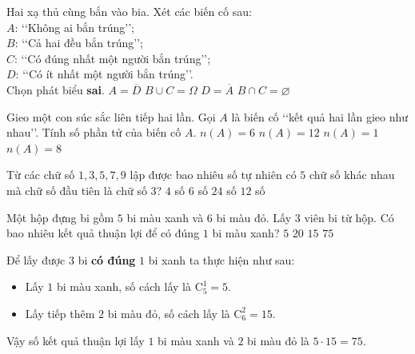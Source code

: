 \begin{ex}%
	Hai xạ thủ cùng bắn vào bia. Xét các biến cố sau:\\
	$A$: \lq\lq Không ai bắn trúng\rq\rq;\\
	$B$: \lq\lq Cả hai đều bắn trúng\rq\rq;\\
	$C$: \lq\lq Có đúng nhất một người bắn trúng\rq\rq;\\
	$D$: \lq\lq Có ít nhất một người bắn trúng\rq\rq.\\
	Chọn phát biểu {\bf sai}.
	\choice
	{$A=\overline{D}$}
	{\True $B\cup C=\Omega$}
	{$D=\overline{A}$}
	{$B\cap C=\varnothing$}
\end{ex}

\begin{ex}%
	Gieo một con súc sắc liên tiếp hai lần. Gọi $A$ là biến cố \lq\lq kết quả hai lần gieo như nhau\rq\rq. Tính số phần tử của biến cố $A$.
	\choice
	{\True $n(A)=6$}
	{$n(A)=12$}
	{$n(A)=1$}
	{$n(A)=8$}
\end{ex}

\begin{ex}%
	Từ các chữ số $1, 3, 5, 7, 9$ lập được bao nhiêu số tự nhiên có $5$ chữ số khác nhau mà chữ số đầu tiên là chữ số $3$?
	\choice
	{$4$ số}
	{$6$ số}
	{\True $24$ số}
	{$12$ số}
\end{ex}

\begin{ex}%
	Một hộp đựng bi gồm $5$ bi màu xanh và $6$ bi màu đỏ. Lấy 3 viên bi từ hộp. Có bao nhiêu kết quả thuận lợi để có đúng $1$ bi màu xanh?
	\choice
	{$5$}
	{$20$}
	{$15$}
	{\True $75$}
	\loigiai
	{Để lấy được $ 3 $ bi \textbf{có đúng} $ 1 $ bi xanh ta thực hiện như sau:
		\begin{itemize}
			\item Lấy $1$ bi màu xanh, số cách lấy là $\mathrm{C}^1_5=5$.
			\item Lấy tiếp thêm $ 2 $ bi màu đỏ, số cách lấy là $\mathrm{C}^2_6=15$.
		\end{itemize}
		Vậy số kết quả thuận lợi lấy $1$ bi màu xanh và $2$ bi màu đỏ là $5 \cdot 15 = 75$.
	}
\end{ex}

